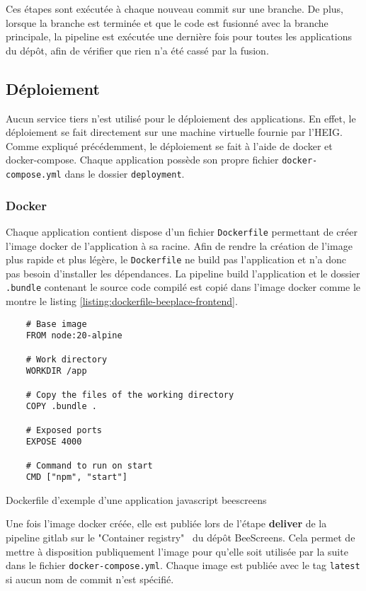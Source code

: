 Ces étapes sont exécutée à chaque nouveau commit sur une branche. De plus, lorsque la branche est terminée et que le code est fusionné avec la branche principale, la pipeline est exécutée une dernière fois pour toutes les applications du dépôt, afin de vérifier que rien n'a été cassé par la fusion.

\subsection{Déploiement}
\label{sec:deploiement}

Aucun service tiers n'est utilisé pour le déploiement des applications. En effet, le déploiement se fait directement sur une machine virtuelle fournie par l'HEIG. Comme expliqué précédemment, le déploiement se fait à l'aide de \gls{docker} et \gls{docker-compose}. Chaque application possède son propre fichier \texttt{docker-compose.yml} dans le dossier \texttt{deployment}.

\subsubsection{Docker}

Chaque application contient dispose d'un fichier \texttt{Dockerfile} permettant de créer l'image \gls{docker} de l'application à sa racine. Afin de rendre la création de l'image plus rapide et plus légère, le \texttt{Dockerfile} ne build pas l'application et n'a donc pas besoin d'installer les dépendances. La pipeline build l'application et le dossier \texttt{.bundle} contenant le source code compilé est copié dans l'image \gls{docker} comme le montre le listing \ref{listing:dockerfile-beeplace-frontend}.

\begin{listing}[H]
  \begin{verbatim}
    # Base image
    FROM node:20-alpine

    # Work directory
    WORKDIR /app

    # Copy the files of the working directory
    COPY .bundle .

    # Exposed ports
    EXPOSE 4000

    # Command to run on start
    CMD ["npm", "start"]
\end{verbatim}
  \caption{Dockerfile d'exemple d'une application \gls{javascript} \gls{beescreens}}
  \label{listing:dockerfile-beeplace-frontend}
\end{listing}

Une fois l'image \gls{docker} créée, elle est publiée lors de l'étape \textbf{deliver} de la pipeline \gls{gitlab} sur le "Container registry"~\cite{beescreens-container-registry} du dépôt BeeScreens. Cela permet de mettre à disposition publiquement l'image pour qu'elle soit utilisée par la suite dans le fichier \texttt{docker-compose.yml}. Chaque image est publiée avec le tag \texttt{latest} si aucun nom de commit n'est spécifié.

